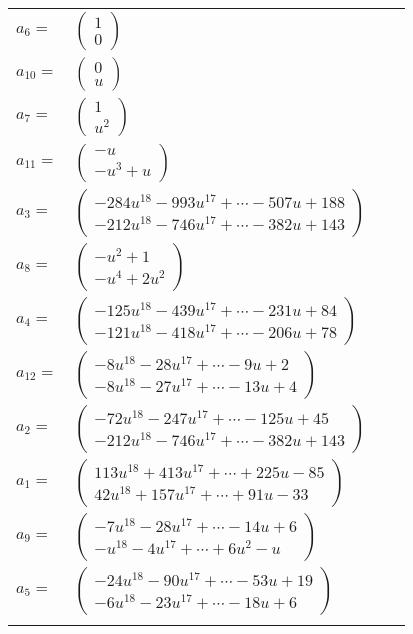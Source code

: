 \documentclass[1p]{elsarticle_modified}
\theoremstyle{definition}
\begin{document}
\begin{tabular}{m{7pt} m{180pt} m{7pt} m{180pt} }
\flushright $a_{6}=$&$\begin{pmatrix}1\\0\end{pmatrix}$ \\
\flushright $a_{10}=$&$\begin{pmatrix}0\\u\end{pmatrix}$ \\
\flushright $a_{7}=$&$\begin{pmatrix}1\\u^2\end{pmatrix}$ \\
\flushright $a_{11}=$&$\begin{pmatrix}- u\\- u^3+u\end{pmatrix}$ \\
\flushright $a_{3}=$&$\begin{pmatrix}-284 u^{18}-993 u^{17}+\cdots-507 u+188\\-212 u^{18}-746 u^{17}+\cdots-382 u+143\end{pmatrix}$ \\
\flushright $a_{8}=$&$\begin{pmatrix}- u^2+1\\- u^4+2 u^2\end{pmatrix}$ \\
\flushright $a_{4}=$&$\begin{pmatrix}-125 u^{18}-439 u^{17}+\cdots-231 u+84\\-121 u^{18}-418 u^{17}+\cdots-206 u+78\end{pmatrix}$ \\
\flushright $a_{12}=$&$\begin{pmatrix}-8 u^{18}-28 u^{17}+\cdots-9 u+2\\-8 u^{18}-27 u^{17}+\cdots-13 u+4\end{pmatrix}$ \\
\flushright $a_{2}=$&$\begin{pmatrix}-72 u^{18}-247 u^{17}+\cdots-125 u+45\\-212 u^{18}-746 u^{17}+\cdots-382 u+143\end{pmatrix}$ \\
\flushright $a_{1}=$&$\begin{pmatrix}113 u^{18}+413 u^{17}+\cdots+225 u-85\\42 u^{18}+157 u^{17}+\cdots+91 u-33\end{pmatrix}$ \\
\flushright $a_{9}=$&$\begin{pmatrix}-7 u^{18}-28 u^{17}+\cdots-14 u+6\\- u^{18}-4 u^{17}+\cdots+6 u^2- u\end{pmatrix}$ \\
\flushright $a_{5}=$&$\begin{pmatrix}-24 u^{18}-90 u^{17}+\cdots-53 u+19\\-6 u^{18}-23 u^{17}+\cdots-18 u+6\end{pmatrix}$\\&\end{tabular}
\end{document}
